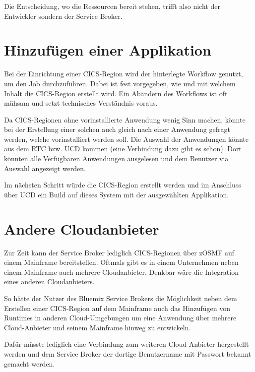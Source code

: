 Die Entscheidung, wo die Ressourcen bereit stehen, trifft also nicht der Entwickler sondern der Service Broker.

\section{Hinzufügen einer Applikation}
Bei der Einrichtung einer CICS-Region wird der hinterlegte Workflow genutzt, um den Job durchzuführen. Dabei ist fest
vorgegeben, wie und mit welchem Inhalt die CICS-Region erstellt wird. Ein Abändern des Workflows ist oft mühsam und
setzt technisches Verständnis voraus.

Da CICS-Regionen ohne vorinstallierte Anwendung wenig Sinn machen, könnte bei der Erstellung einer solchen auch gleich
nach einer Anwendung gefragt werden, welche vorinstalliert werden soll. Die Auswahl der Anwendungen könnte aus dem RTC bzw.
UCD kommen (eine Verbindung dazu gibt es schon). Dort könnten alle Verfügbaren Anwendungen ausgelesen und dem  Benutzer
via Auswahl angezeigt werden.

Im nächsten Schritt würde die CICS-Region erstellt werden und im Anschluss über UCD ein Build auf dieses System mit der
ausgewählten Applikation.

\section{Andere Cloudanbieter}
Zur Zeit kann der Service Broker lediglich CICS-Regionen über zOSMF auf einem Mainframe bereitstellen. Oftmals gibt es
in einem Unternehmen neben einem Mainframe auch mehrere Cloudanbieter. Denkbar wäre die Integration eines anderen
Cloudanbieters.

So hätte der Nutzer des Bluemix Service Brokers die Möglichkeit neben dem Erstellen einer CICS-Region auf dem Mainframe
auch das Hinzufügen von Runtimes in anderen Cloud-Umgebungen um eine Anwendung über mehrere Cloud-Anbieter und seinem
Mainframe hinweg zu entwickeln.

Dafür müsste lediglich eine Verbindung zum weiteren Cloud-Anbieter hergestellt werden und dem Service Broker der dortige
Benutzername mit Passwort bekannt gemacht werden.